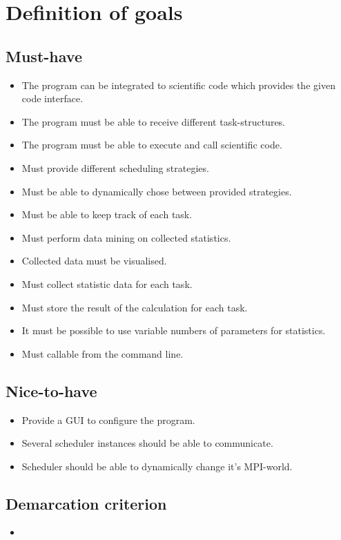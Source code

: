 \section{Definition of goals}
	\subsection{Must-have}
		\begin{itemize}
			\item The program can be integrated to scientific code which provides the given code interface.
			\item The program must be able to receive different task-structures.
			\item The program must be able to execute and call scientific code.
			\item Must provide different scheduling strategies.
			\item Must be able to dynamically chose between provided strategies.
			\item Must be able to keep track of each task.
			\item Must perform data mining on collected statistics.
			\item Collected data must be visualised.
			\item Must collect statistic data for each task.
			\item Must store the result of the calculation for each task.
			\item It must be possible to use variable numbers of parameters for statistics.
			\item Must callable from the command line.
		\end{itemize}
	\subsection{Nice-to-have}
		\begin{itemize}
			\item Provide a GUI to configure the program.
			\item Several scheduler instances should be able to communicate.
			\item Scheduler should be able to dynamically change it's MPI-world.
		\end{itemize}
	\subsection{Demarcation criterion}
		\begin{itemize}
			\item
		\end{itemize}
